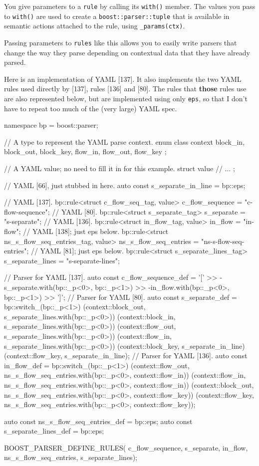 You give parameters to a \texttt{rule} by calling its \texttt{with()} member. The values you pass to \texttt{with()} are used to create a \texttt{boost::parser::tuple} that is available in semantic actions attached to the rule, using \texttt{\_params(ctx)}.

Passing parameters to \texttt{rules} like this allows you to easily write parsers that change the way they parse depending on contextual data that they have already parsed.

Here is an implementation of YAML {[}137{]}. It also implements the two YAML rules used directly by {[}137{]}, rules {[}136{]} and {[}80{]}. The rules that \textbf{those} rules use are also represented below, but are implemented using only \texttt{eps}, so that I don't have to repeat too much of the (very large) YAML spec.

\begin{code}
namespace bp = boost::parser;

// A type to represent the YAML parse context.
enum class context {
    block_in,
    block_out,
    block_key,
    flow_in,
    flow_out,
    flow_key
};

// A YAML value; no need to fill it in for this example.
struct value
{
    // ...
};

// YAML [66], just stubbed in here.
auto const s_separate_in_line = bp::eps;

// YAML [137].
bp::rule<struct c_flow_seq_tag, value> c_flow_sequence = "c-flow-sequence";
// YAML [80].
bp::rule<struct s_separate_tag> s_separate = "s-separate";
// YAML [136].
bp::rule<struct in_flow_tag, value> in_flow = "in-flow";
// YAML [138]; just eps below.
bp::rule<struct ns_s_flow_seq_entries_tag, value> ns_s_flow_seq_entries =
    "ns-s-flow-seq-entries";
// YAML [81]; just eps below.
bp::rule<struct s_separate_lines_tag> s_separate_lines = "s-separate-lines";

// Parser for YAML [137].
auto const c_flow_sequence_def =
    '[' >>
    -s_separate.with(bp::_p<0>, bp::_p<1>) >>
    -in_flow.with(bp::_p<0>, bp::_p<1>) >>
    ']';
// Parser for YAML [80].
auto const s_separate_def = bp::switch_(bp::_p<1>)
    (context::block_out, s_separate_lines.with(bp::_p<0>))
    (context::block_in, s_separate_lines.with(bp::_p<0>))
    (context::flow_out, s_separate_lines.with(bp::_p<0>))
    (context::flow_in, s_separate_lines.with(bp::_p<0>))
    (context::block_key, s_separate_in_line)
    (context::flow_key, s_separate_in_line);
// Parser for YAML [136].
auto const in_flow_def = bp::switch_(bp::_p<1>)
    (context::flow_out, ns_s_flow_seq_entries.with(bp::_p<0>, context::flow_in))
    (context::flow_in, ns_s_flow_seq_entries.with(bp::_p<0>, context::flow_in))
    (context::block_out, ns_s_flow_seq_entries.with(bp::_p<0>, context::flow_key))
    (context::flow_key, ns_s_flow_seq_entries.with(bp::_p<0>, context::flow_key));

auto const ns_s_flow_seq_entries_def = bp::eps;
auto const s_separate_lines_def = bp::eps;

BOOST_PARSER_DEFINE_RULES(
    c_flow_sequence,
    s_separate,
    in_flow,
    ns_s_flow_seq_entries,
    s_separate_lines);
\end{code}

